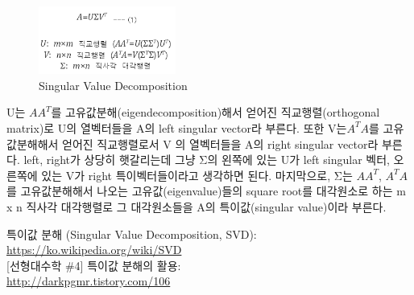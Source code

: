 \documentclass[a4paper,
              ]{jacow}
\begin{document}
\begin{figure}[h!]
	\centering
	\includegraphics[width=0.4\textwidth,height=0.15\textwidth]{./svd.png}
	\caption{Singular Value Decomposition}
	\label{fig:Singular Value Decompostion} 
\end{figure}

U는 $AA^T$를 고유값분해(eigendecomposition)해서 얻어진 직교행렬(orthogonal matrix)로 U의 열벡터들을 A의 left singular vector라 부른다. 또한 V는$ A^TA$를 고유값분해해서 얻어진 직교행렬로서 V 의 열벡터들을 A의 right singular vector라 부른다.  left, right가 상당히 햇갈리는데 그냥 Σ의 왼쪽에 있는 U가 left singular 벡터, 오른쪽에 있는 V가 right 특이벡터들이라고 생각하면 된다. 마지막으로, Σ는 $AA^T$, $A^TA$를 고유값분해해서 나오는 고유값(eigenvalue)들의 square root를 대각원소로 하는 m x n 직사각 대각행렬로 그 대각원소들을 A의 특이값(singular value)이라 부른다.

\iftrue   %
	\raggedend
\fi

\iffalse  %
	\printbibliography

\else

\begin{thebibliography}{9}   %
특이값 분해 (Singular Value Decomposition, SVD):\\
\url{https://ko.wikipedia.org/wiki/SVD} \\

[선형대수학 \#4] 특이값 분해의 활용:\\
\url{http://darkpgmr.tistory.com/106} \\



\end{thebibliography}

\fi
\end{document}
